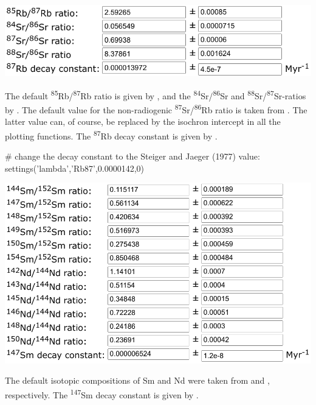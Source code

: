\begin{refsection}
\noindent\begin{minipage}[t]{.6\linewidth}
\strut\vspace*{-\baselineskip}\newline
\includegraphics[width=\linewidth]{../figures/RbSrLambda.png}
\end{minipage}
\begin{minipage}[t]{.4\linewidth}
The default \textsuperscript{85}Rb/\textsuperscript{87}Rb ratio is
given by \citet{catanzaro1969}, and the
\textsuperscript{84}Sr/\textsuperscript{86}Sr and
\textsuperscript{88}Sr/\textsuperscript{87}Sr-ratios by
\citet{moore1982}. The default value for the non-radiogenic
\textsuperscript{87}Sr/\textsuperscript{86}Rb ratio is taken from
\citet{compston1971}. The latter value can, of course, be replaced by
the isochron intercept in all the plotting functions. The
\textsuperscript{87}Rb decay constant is given by \citet{villa2015}.
\end{minipage}

\begin{script}
# change the decay constant to the Steiger and Jaeger (1977) value:
settings('lambda','Rb87',0.0000142,0)
\end{script}

\noindent\begin{minipage}[t]{.6\linewidth}
\strut\vspace*{-\baselineskip}\newline
\includegraphics[width=\linewidth]{../figures/SmNdLambda.png}
\end{minipage}
\begin{minipage}[t]{.4\linewidth}
  The default isotopic compositions of Sm and Nd were taken from
  \citet{chang2002} and \citet{zhao2005}, respectively. The
  \textsuperscript{147}Sm decay constant is given by
  \citet{villa2020}.
\end{minipage}


\end{refsection}
